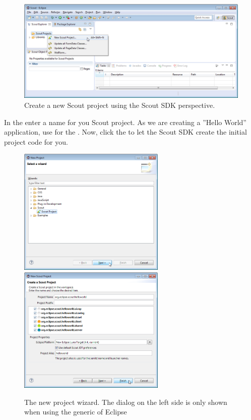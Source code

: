 \documentclass[a4paper,10pt,twoside]{book}
\begin{document}
\begin{figure}
\includegraphics[width=15cm]{sdk_create_new_scout_project.png}
\caption{Create a new Scout project using the Scout SDK perspective.}
\end{figure}

In the  enter a name for you Scout project. 
As we are creating a ''Hello World'' application, use  for the .
Now, click the  to let the Scout SDK create the initial project code for you.

\begin{figure}
\includegraphics[width=7cm]{sdk_new_project_1.png} \hspace{5mm}
\includegraphics[width=7cm]{sdk_new_project_2.png}
\caption{The new project wizard. The dialog on the left side is only shown when using the generic  of Eclipse}
\end{figure}
\end{document}
